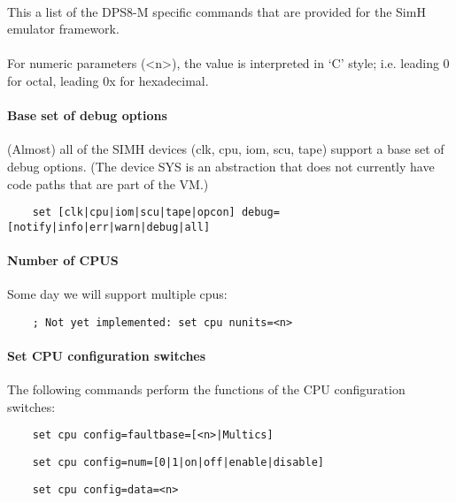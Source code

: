 \documentclass[notitlepage]{report}
\begin{document}
\paragraph{}
This a list of the DPS8-M specific commands that are provided for the SimH emulator framework.

\paragraph{}
For numeric parameters (<n>), the value is interpreted in `C' style; i.e. leading 0 for octal, leading 0x for hexadecimal.

\paragraph{Base set of debug options} (Almost) all of the SIMH devices (clk, cpu, iom, scu, tape) support a base set of debug options. (The device SYS is an abstraction that does not currently have code paths that are part of the VM.)

\begin{lstlisting}
	set [clk|cpu|iom|scu|tape|opcon] debug=[notify|info|err|warn|debug|all]
\end{lstlisting}

\paragraph{Number of CPUS} Some day we will support multiple cpus:

\begin{lstlisting}
	; Not yet implemented: set cpu nunits=<n>
\end{lstlisting}


\paragraph{Set CPU configuration switches}
The following commands perform the functions of the CPU configuration switches:

\begin{lstlisting}
	set cpu config=faultbase=[<n>|Multics]
\end{lstlisting}

\begin{lstlisting}
	set cpu config=num=[0|1|on|off|enable|disable]
\end{lstlisting}

\begin{lstlisting}
	set cpu config=data=<n>
\end{lstlisting}
\end{document}
